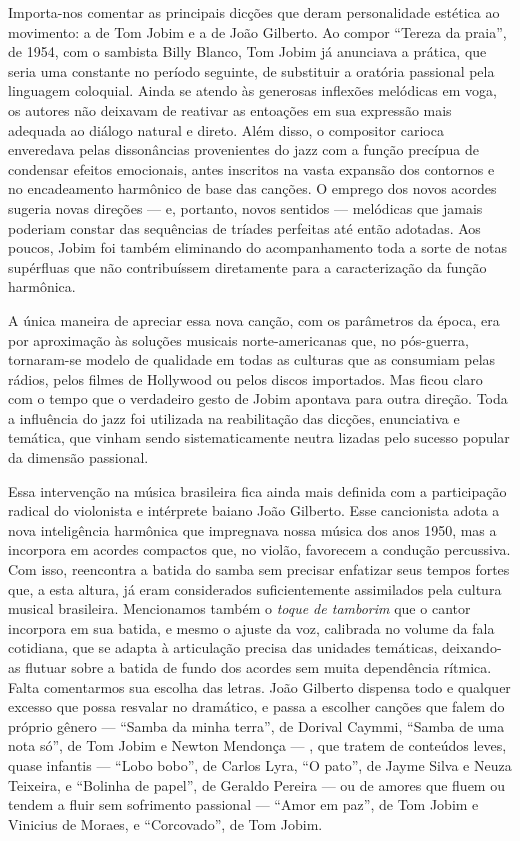 Importa-nos comentar as principais dicções que deram personalidade
estética ao movimento: a de Tom Jobim e a de João Gilberto. Ao compor
``Tereza da praia'', de 1954, com o sambista Billy Blanco, Tom Jobim já
anunciava a prática, que seria uma constante no período seguinte, de
substituir a oratória passional pela linguagem coloquial. Ainda se
atendo às generosas inflexões melódicas em voga, os autores não deixavam
de reativar as entoações em sua expressão mais adequada ao diálogo
natural e direto. Além disso, o compositor carioca enveredava pelas
dissonâncias provenientes do jazz com a função precípua de condensar
efeitos emocionais, antes inscritos na vasta expansão dos contornos e no
encadeamento harmônico de base das canções. O emprego dos novos acordes
sugeria novas direções --- e, portanto, novos sentidos --- melódicas que
jamais poderiam constar das sequências de tríades perfeitas até então
adotadas. Aos poucos, Jobim foi também eliminando do acompanhamento toda
a sorte de notas supérfluas que não contribuíssem diretamente para a
caracterização da função harmônica.

A única maneira de apreciar essa nova canção, com os parâmetros da
época, era por aproximação às soluções musicais norte-americanas que, no
pós-guerra, tornaram-se modelo de qualidade em todas as culturas que as
consumiam pelas rádios, pelos filmes de Hollywood ou pelos discos
importados. Mas ficou claro com o tempo que o verdadeiro gesto de Jobim
apontava para outra direção. Toda a influência do jazz foi utilizada na
reabilitação das dicções, enunciativa e temática, que vinham sendo
sistematicamente neutra lizadas pelo sucesso popular da dimensão
passional.

Essa intervenção na música brasileira fica ainda mais definida com a
participação radical do violonista e intérprete baiano João Gilberto.
Esse cancionista adota a nova inteligência harmônica que impregnava
nossa música dos anos 1950, mas a incorpora em acordes compactos que, no
violão, favorecem a condução percussiva. Com isso, reencontra a batida
do samba sem precisar enfatizar seus tempos fortes que, a esta altura,
já eram considerados suficientemente assimilados pela cultura musical
brasileira. Mencionamos também o \textit{toque de tamborim} que o cantor
incorpora em sua batida, e mesmo o ajuste da voz, calibrada no volume da
fala cotidiana, que se adapta à articulação precisa das unidades
temáticas, deixando-as flutuar sobre a batida de fundo dos acordes sem
muita dependência rítmica. Falta comentarmos sua escolha das letras.
João Gilberto dispensa todo e qualquer excesso que possa resvalar no
dramático, e passa a escolher canções que falem do próprio gênero --- ``Samba da minha terra'', de Dorival Caymmi, ``Samba de uma nota só'', de Tom Jobim e Newton Mendonça --- , que tratem de conteúdos leves, quase
infantis --- ``Lobo bobo'', de Carlos Lyra, ``O pato'', de Jayme Silva e Neuza Teixeira, e ``Bolinha de papel'', de Geraldo Pereira --- ou de
amores que fluem ou tendem a fluir sem sofrimento passional --- ``Amor em
paz'', de Tom Jobim e Vinicius de Moraes, e ``Corcovado'', de Tom Jobim.

